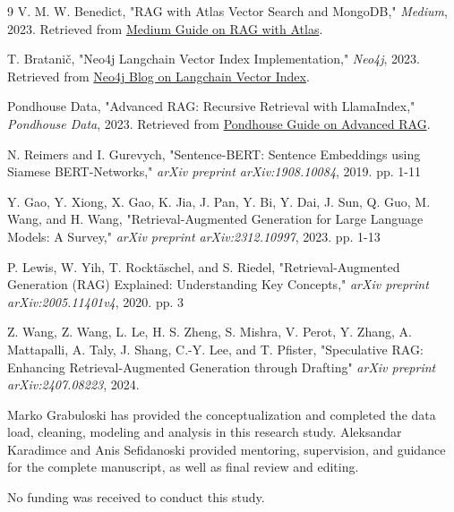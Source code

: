 \documentclass{wseas}
\begin{document}
\begin{thebibliography}{9}
   V. M. W. Benedict, "RAG with Atlas Vector Search and MongoDB," \textit{Medium}, 2023. Retrieved from \href{https://medium.com/@if-21062/rag-with-atlas-vector-search-mongodb-0d2420e00b64}{Medium Guide on RAG with Atlas}.
  
   T. Bratanič, "Neo4j Langchain Vector Index Implementation," \textit{Neo4j}, 2023. Retrieved from \href{https://neo4j.com/developer-blog/neo4j-langchain-vector-index-implementation/}{Neo4j Blog on Langchain Vector Index}.
  
   Pondhouse Data, "Advanced RAG: Recursive Retrieval with LlamaIndex," \textit{Pondhouse Data}, 2023. Retrieved from \href{https://www.pondhouse-data.com/blog/advanced-rag-recursive-retrieval-with-llamaindex}{Pondhouse Guide on Advanced RAG}.

   N. Reimers and I. Gurevych, "Sentence-BERT: Sentence Embeddings using Siamese BERT-Networks," \textit{arXiv preprint arXiv:1908.10084}, 2019. pp. 1-11

   Y. Gao, Y. Xiong, X. Gao, K. Jia, J. Pan, Y. Bi, Y. Dai, J. Sun, Q. Guo, M. Wang, and H. Wang, "Retrieval-Augmented Generation for Large Language Models: A Survey," \textit{arXiv preprint arXiv:2312.10997}, 2023. pp. 1-13
  
   P. Lewis, W. Yih, T. Rocktäschel, and S. Riedel, "Retrieval-Augmented Generation (RAG) Explained: Understanding Key Concepts," \textit{arXiv preprint arXiv:2005.11401v4}, 2020. pp. 3
    
   Z. Wang, Z. Wang, L. Le, H. S. Zheng, S. Mishra, V. Perot, Y. Zhang, A. Mattapalli, A. Taly, J. Shang, C.-Y. Lee, and T. Pfister, "Speculative RAG: Enhancing Retrieval-Augmented Generation through Drafting" \textit{arXiv preprint arXiv:2407.08223}, 2024.
  
\end{thebibliography}

\flushleft {}
\par{
  \noindent 
  {Marko Grabuloski has provided the conceptualization and completed the data load, cleaning, modeling and analysis in this research study.} \break
  Aleksandar Karadimce and Anis Sefidanoski provided mentoring, supervision, and guidance for the complete manuscript, as well as final review and editing.\break

  \flushleft {}
  \par { \noindent No funding was received to conduct this study.}
  \break

  \flushleft {}
}
\end{document}
